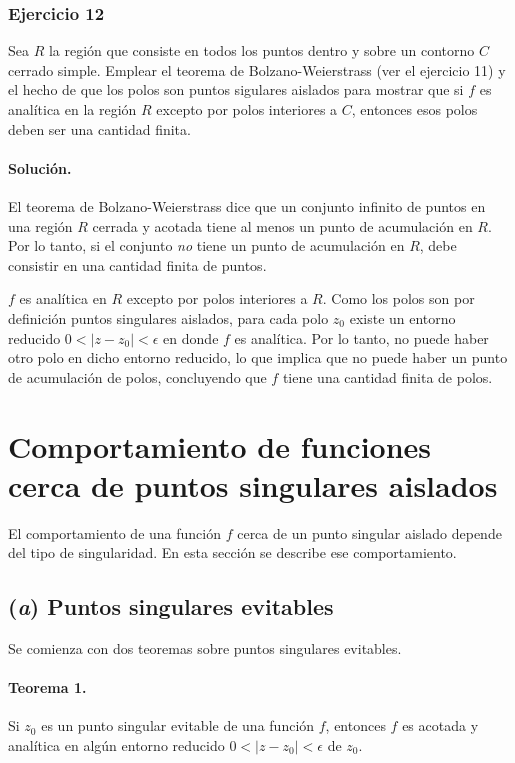 \documentclass[a4paper]{report}
\begin{document}
\subsubsection{Ejercicio 12} 

Sea \(R\) la región que consiste en todos los puntos dentro y sobre un contorno \(C\) cerrado simple. Emplear el teorema de Bolzano-Weierstrass (ver el ejercicio 11) y el hecho de que los polos son puntos sigulares aislados para mostrar que si \(f\) es analítica en la región \(R\) excepto por polos interiores a \(C\), entonces esos polos deben ser una cantidad finita.

\paragraph{Solución.} El teorema de Bolzano-Weierstrass dice que un conjunto infinito de puntos en una región \(R\) cerrada y acotada tiene al menos un punto de acumulación en \(R\). Por lo tanto, si el conjunto \emph{no} tiene un punto de acumulación en \(R\), debe consistir en una cantidad finita de puntos.

\(f\) es analítica en \(R\) excepto por polos interiores a \(R\). Como los polos son por definición puntos singulares aislados, para cada polo \(z_0 \) existe un entorno reducido \(0<|z-z_0|<\epsilon\) en donde \(f\) es analítica. Por lo tanto, no puede haber otro polo en dicho entorno reducido, lo que implica que no puede haber un punto de acumulación de polos, concluyendo que \(f\) tiene una cantidad finita de polos.

\section{Comportamiento de funciones cerca de puntos singulares aislados}

El comportamiento de una función \(f\) cerca de un punto singular aislado depende del tipo de singularidad. En esta sección se describe ese comportamiento.

\subsection*{(\textit{a}) Puntos singulares evitables}
 
Se comienza con dos teoremas sobre puntos singulares evitables. 

\paragraph{Teorema 1.} Si \(z_0\) es un punto singular evitable de una función \(f\), entonces \(f\) es acotada y analítica en algún entorno reducido \(0<|z-z_0|<\epsilon\) de \(z_0\). 
\end{document}
